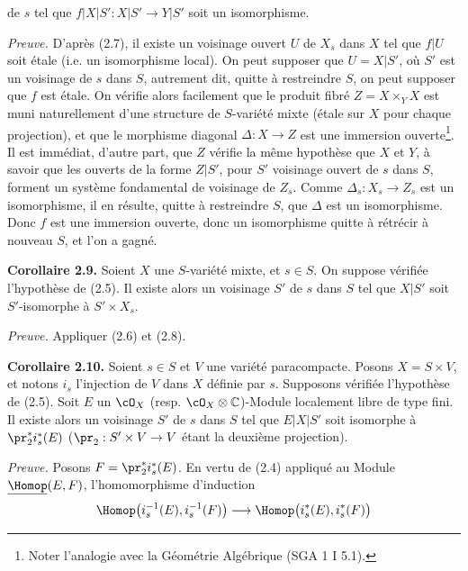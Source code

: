 de $s$ tel que $f|X|S':X|S'\longrightarrow Y|S'$
soit un isomorphisme.

\emph{Preuve.} D'après (2.7), il existe un voisinage ouvert $U$ de $X_s$ dans $X$ tel que $f|U$ soit étale (i.e. un isomorphisme local). On peut supposer que $U=X|S'$, où $S'$ est un voisinage de $s$ dans $S$, autrement dit, quitte à restreindre $S$, on peut supposer que $f$ est étale. On vérifie alors facilement que le produit fibré $Z=X\times_Y X$ est muni naturellement d'une structure de $S$-variété mixte (étale sur $X$ pour chaque projection), et que le morphisme diagonal $\Delta:X\to Z$ est une immersion ouverte\footnote{Noter l'analogie avec la Géométrie Algébrique (SGA 1 I 5.1).}. Il est immédiat, d'autre part, que $Z$ vérifie la même hypothèse que $X$ et $Y$, à savoir que les ouverts de la forme $Z|S'$, pour $S'$ voisinage ouvert de $s$ dans $S$, forment un système fondamental de voisinage de $Z_s$. Comme $\Delta_s:X_s\to Z_s$ est un isomorphisme, il en résulte, quitte à restreindre $S$, que $\Delta$ est un isomorphisme. Donc $f$ est une immersion ouverte, donc un isomorphisme quitte à rétrécir à nouveau $S$, et l'on a gagné.

\textbf{Corollaire 2.9.} Soient $X$ une $S$-variété mixte, et $s\in S$. On suppose vérifiée l'hypothèse de (2.5). Il existe alors un voisinage $S'$ de $s$ dans $S$ tel que $X|S'$ soit $S'$-isomorphe à $S'\times X_s$.

\emph{Preuve.} Appliquer (2.6) et (2.8).

\textbf{Corollaire 2.10.} Soient $s\in S$ et $V$ une variété paracompacte. Posons $X=S\times V$, et notons $i_s$ l'injection de $V$ dans $X$ définie par $s$. Supposons vérifiée l'hypothèse de (2.5). Soit $E$ un $\cO_X$ (resp. $\cO_X\otimes\mathbb C$)-Module localement libre de type fini. Il existe alors un voisinage $S'$ de $s$ dans $S$ tel que $E|X|S'$ soit isomorphe à $\pr_2^*i_s^*(E)$ ($\pr_2:S'\times V\to V$ étant la deuxième projection).

\emph{Preuve.} Posons $F=\pr_2^*i_s^*(E)$. En vertu de (2.4) appliqué au Module $\underline{\Homop}(E,F)$, l'homomorphisme d'induction
\[
  \Homop\bigl(i_s^{-1}(E),i_s^{-1}(F)\bigr)
  \longrightarrow
  \Homop\bigl(i_s^*(E),i_s^*(F)\bigr)
\]
